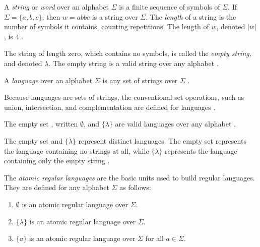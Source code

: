 \documentclass{bcthesis}
\renewcommand{\meo}[1]{}
\newcommand{\footcite}[2]{\xspace\cite[pg.~{#2}]{#1}\xspace}
\begin{document}
		\begin{definition}[String]
			A \textit{string} or \textit{word} over an alphabet $\Sigma$ is a finite sequence of symbols of $\Sigma$.
			If $\Sigma = \{ a, b ,c \}$, then $w = abbc$ is a string over $\Sigma$.
			The \textit{length} of a string is the number of symbols it contains, counting repetitions.
			The length of $w$, denoted $|w|$, is $4$ \footcite{hopcroft}{1}.

			The string of length zero, which contains no symbols, is called the \textit{empty string}, and denoted $\lambda$.
			The empty string is a valid string over any alphabet \footcite{salomaa}{1}.
		\end{definition}

		\begin{definition}[Language]
			A \textit{language} over an alphabet $\Sigma$ is any set of strings over $\Sigma$ \footcite{hopcroft}{2}.

			Because languages are sets of strings, the conventional set operations, such as union, intersection, and complementation are defined for languages \footcite{hopcroft}{5}.

			The empty set , written $\emptyset$, and $\{ \lambda \}$ are valid languages over any alphabet \footcite{hopcroft}{2}.

		\end{definition}

		\begin{remark}
			The empty set and $\{ \lambda \}$ represent distinct languages. 
			The empty set represents the language containing no strings at all, while $\{ \lambda \}$ represents the language containing only the empty string \footcite{hopcroft}{2}.
		\end{remark}


\label{ch:regular_expressions}
	
	\meo{Add an introduction.}

	\begin{definition}
		The \textit{atomic regular languages} are the basic units used to build regular languages.
		They are defined for any alphabet $\Sigma$ as follows:

		\begin{enumerate}[label=(\roman*), itemsep = -0.3 ex, nolistsep]
			\item $\emptyset$ is an atomic regular language over $\Sigma$.
			\item $\{ \lambda \}$ is an atomic regular language over $\Sigma$.
			\item $\{ a \}$ is an atomic regular language over $\Sigma$ for all $a \in \Sigma$.
		\end{enumerate}
		\footcite{hopcroft}{28}~ \meo{todo: something about this citation.}
	\end{definition}
\end{document}
